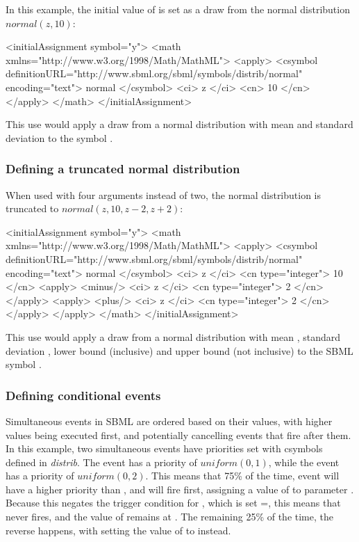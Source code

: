 \documentclass[draftspec]{sbmlpkgspec}
\newcommand{\distribshort}{\emph{distrib}\xspace}
\begin{document}
In this example, the initial value of  is set as a draw from the normal distribution $normal(z, 10)$:

\begin{example}
  <initialAssignment symbol="y">
    <math xmlns="http://www.w3.org/1998/Math/MathML">
      <apply>
        <csymbol definitionURL="http://www.sbml.org/sbml/symbols/distrib/normal"
                 encoding="text"> normal </csymbol>
        <ci> z </ci>
        <cn> 10 </cn>
      </apply>
    </math>
  </initialAssignment>
\end{example}

This use would apply a draw from a normal distribution with mean  and standard deviation  to the symbol .

\subsubsection{Defining a truncated normal distribution}

When used with four arguments instead of two, the normal distribution is truncated to $normal(z, 10, z-2, z+2)$:

\begin{example}
  <initialAssignment symbol="y">
    <math xmlns="http://www.w3.org/1998/Math/MathML">
      <apply>
        <csymbol definitionURL="http://www.sbml.org/sbml/symbols/distrib/normal"
                 encoding="text"> normal </csymbol>
        <ci> z </ci>
        <cn type="integer"> 10 </cn>
        <apply>
          <minus/>
          <ci> z </ci>
          <cn type="integer"> 2 </cn>
        </apply>
        <apply>
          <plus/>
          <ci> z </ci>
          <cn type="integer"> 2 </cn>
        </apply>
      </apply>
    </math>
  </initialAssignment>
\end{example}

This use would apply a draw from a normal distribution with mean , standard deviation , lower bound  (inclusive) and upper bound  (not inclusive) to the SBML symbol .

\subsubsection{Defining conditional events}

Simultaneous events in SBML are ordered based on their \Priority values, with higher values being executed first, and potentially cancelling events that fire after them.  In this example, two simultaneous events have priorities set with csymbols defined in \distribshort.  The event  has a priority of $uniform(0,1)$, while the event  has a priority of $uniform(0,2)$.  This means that 75\% of the time, event  will have a higher priority than , and will fire first, assigning a value of  to parameter .  Because this negates the trigger condition for , which is set =, this means that  never fires, and the value of  remains at .  The remaining 25\% of the time, the reverse happens, with  setting the value of  to  instead.
\end{document}
